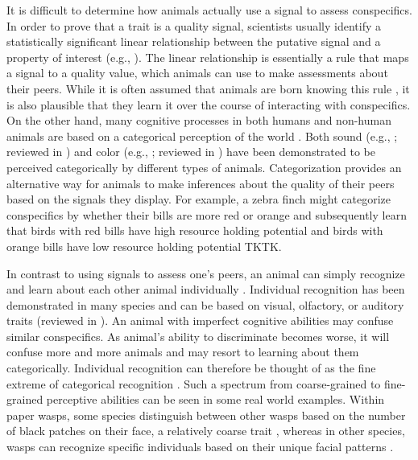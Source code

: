 It is difficult to determine how animals actually use a signal to assess conspecifics. In order to prove that a trait is a quality signal, scientists usually identify a statistically significant linear relationship between the putative signal and a property of interest (e.g., \citealp{Rohwer:1981vn,Rohwer:1982fk,Ripoll:2004vn,Tibbetts:2004kx}). The linear relationship is essentially a rule that maps a signal to a quality value, which animals can use to make assessments about their peers. While it is often assumed that animals are born knowing this rule \citep{sheehan2016evotradeoff}, it is also plausible that they learn it over the course of interacting with conspecifics. On the other hand, many cognitive processes in both humans and non-human animals are based on a categorical perception of the world \citep{Harnad:1990ux}. Both sound (e.g., \citealp{Wyttenbach:1996wj,Nelson:1989rt}; reviewed in \citealp{Bornstein:1987ec,Ehret:1987jh}) and color (e.g., \citealp{Lim:2016ye}; reviewed in \citealp{Bornstein:1987ec}) have been demonstrated to be perceived categorically by different types of animals. Categorization provides an alternative way for animals to make inferences about the quality of their peers based on the signals they display. For example, a zebra finch might categorize conspecifics by whether their bills are more red or orange and subsequently learn that birds with red bills have high resource holding potential and birds with orange bills have low resource holding potential TKTK.   
 
In contrast to using signals to assess one's peers, an animal can simply recognize and learn about each other animal individually \citep{sheehan2016evotradeoff}. Individual recognition has been demonstrated in many species and can be based on visual, olfactory, or auditory traits (reviewed in \citep{Tibbetts2007IndividualDifferent}). An animal with imperfect cognitive abilities may confuse similar conspecifics. As animal's ability to discriminate becomes worse, it will confuse more and more animals and may resort to learning about them categorically. Individual recognition can therefore be thought of as the fine extreme of categorical recognition \citep{Barnard:1979fk}. Such a spectrum from coarse-grained to fine-grained perceptive abilities can be seen in some real world examples. Within paper wasps, some species distinguish between other wasps based on the number of black patches on their face, a relatively coarse trait \citep{Tibbetts:2004kx}, whereas in other species, wasps can recognize specific individuals based on their unique facial patterns \citep{Tibbetts:2002ys}. 

